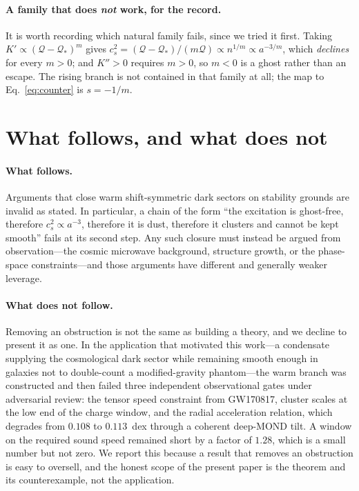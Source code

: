 \documentclass[aps,prd,twocolumn,superscriptaddress,nofootinbib,floatfix]{revtex4-2}
\begin{document}
\paragraph{A family that does \emph{not} work, for the record.}
It is worth recording which natural family fails, since we tried it first. Taking
$K'\propto(\mathcal{Q}-\mathcal{Q}_*)^m$ gives
$c_s^2 = (\mathcal{Q}-\mathcal{Q}_*)/(m\mathcal{Q})\propto n^{1/m}\propto a^{-3/m}$, which
\emph{declines} for every $m>0$; and $K''>0$ requires $m>0$, so $m<0$ is a ghost rather than
an escape. The rising branch is not contained in that family at all; the map to
Eq.~\eqref{eq:counter} is $s=-1/m$.

\section{What follows, and what does not}

\paragraph{What follows.} Arguments that close warm shift-symmetric dark sectors on stability
grounds are invalid as stated. In particular, a chain of the form ``the excitation is
ghost-free, therefore $c_s^2\propto a^{-3}$, therefore it is dust, therefore it clusters and
cannot be kept smooth'' fails at its second step. Any such closure must instead be argued from
observation---the cosmic microwave background, structure growth, or the phase-space
constraints---and those arguments have different and generally weaker leverage.

\paragraph{What does not follow.} Removing an obstruction is not the same as building a
theory, and we decline to present it as one. In the application that motivated this work---a
condensate supplying the cosmological dark sector while remaining smooth enough in galaxies not
to double-count a modified-gravity phantom---the warm branch was constructed and then failed
three independent observational gates under adversarial review: the tensor speed constraint
from GW170817, cluster scales at the low end of the charge window, and the radial acceleration
relation, which degrades from $0.108$ to $0.113$~dex through a coherent deep-MOND tilt. A
window on the required sound speed remained short by a factor of $1.28$, which is a small
number but not zero. We report this because a result that removes an obstruction is easy to
oversell, and the honest scope of the present paper is the theorem and its counterexample, not
the application.
\end{document}
